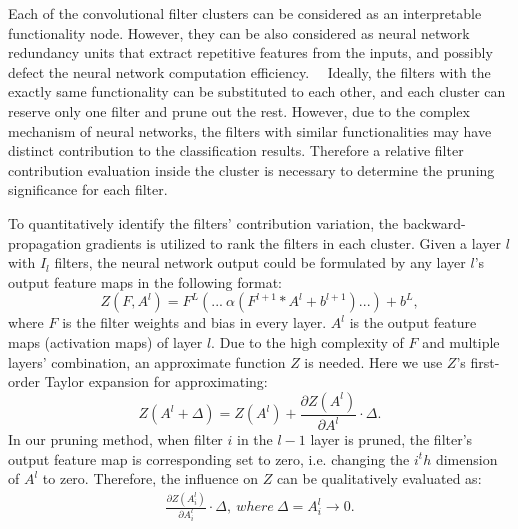 \documentclass{article} %
\begin{document}
Each of the convolutional filter clusters can be considered as an interpretable functionality node.
	However, they can be also considered as neural network redundancy units that extract repetitive features from the inputs, and possibly defect the neural network computation efficiency.
~~Ideally, the filters with the exactly same functionality can be substituted to each other, and each cluster can reserve only one filter and prune out the rest.
	However, due to the complex mechanism of neural networks, the filters with similar functionalities may have distinct contribution to the classification results.
	Therefore a relative filter contribution evaluation inside the cluster is necessary to determine the pruning significance for each filter.

To quantitatively identify the filters' contribution variation, the backward-propagation gradients is utilized to rank the filters in each cluster.
	Given a layer $l$ with $I_{l}$ filters, the neural network output could be formulated by any layer $l$'s output feature maps in the following format:
	\begin{equation}
		Z(F, A^{l}) = F^L (... ~\alpha(F^{l+1} * A^{l}+b^{l+1}) ...) + b^L,
		\label{eq:1}
	\end{equation}
	where $F$ is the filter weights and bias in every layer.
	$A^{l}$ is the output feature maps (activation maps) of layer $l$.
	Due to the high complexity of $F$ and multiple layers' combination, an approximate function $Z$ is needed.
	Here we use $Z$'s first-order Taylor expansion for approximating:
	\begin{equation}
		Z(A^l+\Delta) = Z(A^l) + \frac{\partial Z(A^l)}{\partial A^l} \cdot \Delta.
		\label{eq:1}
	\end{equation}
	In our pruning method, when filter $i$ in the $l-1$ layer is pruned, the filter's output feature map is corresponding set to zero, i.e. changing the $i^th$ dimension of $A^l$ to zero.
	Therefore, the influence on $Z$ can be qualitatively evaluated as:
	\begin{equation}
		\begin{aligned}
			\frac{\partial Z(A_i^l)}{\partial A_i^l} \cdot \Delta, ~ where ~ \Delta = A_i^l \rightarrow 0.
			\label{eq:1}
		\end{aligned}
	\end{equation}
\end{document}
